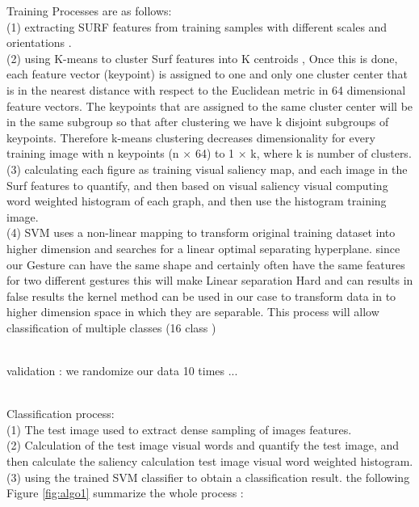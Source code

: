 Training Processes are as follows:\\ (1) extracting SURF
features from training samples with different
scales and  orientations .
\\ (2) using K-means to cluster Surf features into K centroids ,  Once this is done, each feature vector (keypoint) is
assigned to one and only one cluster center that is in the
nearest distance with respect to the Euclidean metric in 64
dimensional feature vectors. The keypoints that are assigned to
the same cluster center will be in the same subgroup so that
after clustering we have k disjoint subgroups of keypoints.
Therefore k-means clustering decreases dimensionality for
every training image with n keypoints (n $\times$ 64) to 1 $\times$ k,
where k is number of clusters.\\ (3) calculating each figure as training visual saliency
map, and each image in the Surf features to quantify, and
then based on visual saliency visual computing word weighted
histogram of each graph, and then use the histogram training
image.\\ (4)  SVM uses a non-linear mapping to transform original training dataset into higher dimension and searches for a linear optimal
separating hyperplane. since our Gesture can have the same shape and certainly often have the same features for two different gestures  this will make Linear separation Hard and can results in false results the kernel method can be used in our case  to transform data  in to higher dimension space in which they are separable. This process will allow classification of multiple classes (16 class ) 

\\validation :
we randomize our data 10 times ...


\\ Classiﬁcation
process:\\ (1) The test image used to extract dense sampling of
images features. \\(2) Calculation of the test image visual words
and quantify the test image, and then calculate the saliency
calculation test image visual word weighted histogram.\\ (3)
using the trained SVM classiﬁer to obtain a classiﬁcation
result.
the following Figure \ref{fig:algo1}  summarize the whole  process :

